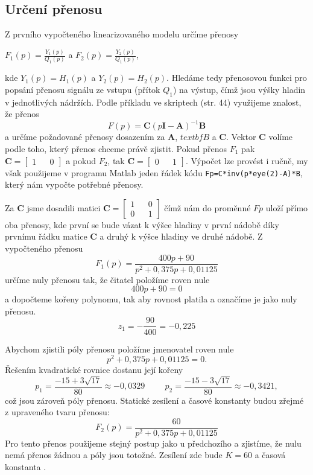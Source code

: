 \documentclass{article}
\begin{document}
		\subsection{Určení přenosu}
			Z prvního vypočteného linearizovaného modelu určíme přenosy
				\begin{center}
					$ F_{1}(p)=\frac{Y_{1}(p)}{Q_{1}(p)} $ \hspace{1cm} a \hspace{1cm} $ F_{2}(p)=\frac{Y_{2}(p)}{Q_{1}(p)} $,
				\end{center}
			kde \(Y_{1}(p) = H_{1}(p)\) a \(Y_{2}(p) = H_{2}(p)\). Hledáme tedy přenosovou funkci pro popsání přenosu signálu ze vstupu (přítok \(Q_{1}\)) na výstup, čímž jsou výšky hladin v jednotlivých nádržích.
			Podle příkladu ve skriptech (str. 44) využijeme znalost, že přenos
			\[F(p)=\textbf{C}(p \textbf{I}-\textbf{A})^{-1}\textbf{B}\]
			a určíme požadované přenosy dosazením za \(\textbf{A}\), \(textbf{B}\) a \(\textbf{C}\). Vektor \(\textbf{C}\) volíme podle toho, který přenos chceme právě zjistit. Pokud přenos \(F_{1}\) pak \(\textbf{C}=\begin{bmatrix}1&&0\end{bmatrix}\) a pokud \(F_{2}\), tak \(\textbf{C}=\begin{bmatrix}0&&1\end{bmatrix}\). Výpočet lze provést i ručně, my však použijeme v programu Matlab jeden řádek kódu \verb|Fp=C*inv(p*eye(2)-A)*B|, který nám vypočte potřebné přenosy.

			 Za \(\textbf{C}\) jsme dosadili matici \(\textbf{C}=\begin{bmatrix}1&&0\\0&&1\end{bmatrix}\) čímž nám do proměnné \(Fp\) uloží přímo oba přenosy, kde první se bude vázat k výšce hladiny v první nádobě díky prvnímu řádku matice \(\textbf{C}\) a druhý k výšce hladiny ve druhé nádobě. Z vypočteného přenosu
			\[F_{1}(p)=\frac{400 p + 90}{p^2 + 0,375 p + 0,01125}\]
			určíme nuly přenosu tak, že čitatel položíme roven nule
			\[400p + 90=0\]
			a dopočteme kořeny polynomu, tak aby rovnost platila a označíme je jako nuly přenosu.
			\[z_{1}=-\frac{90}{400}=-0,225\]

			Abychom zjistili póly přenosu položíme jmenovatel roven nule
			\[p^2 + 0,375 p + 0,01125=0.\]
			Řešením kvadratické rovnice dostanu její kořeny
			\[p_{1}=\frac{-15+3\sqrt{17}}{80}\approx -0,0329 \hspace{1cm} p_{2}=\frac{-15-3\sqrt{17}}{80}\approx -0,3421,\] což jsou zároveň póly přenosu.
			Statické zesílení a časové konstanty budou zřejmé z upraveného tvaru přenosu:
			\[F_{2}(p)=\frac{60}{p^2 + 0,375 p + 0,01125}\]
			Pro tento přenos použijeme stejný postup jako u předchozího a zjistíme, že nulu nemá přenos žádnou a póly jsou totožné. Zesílení zde bude \(K=60\) a časová konstanta .
\end{document}
